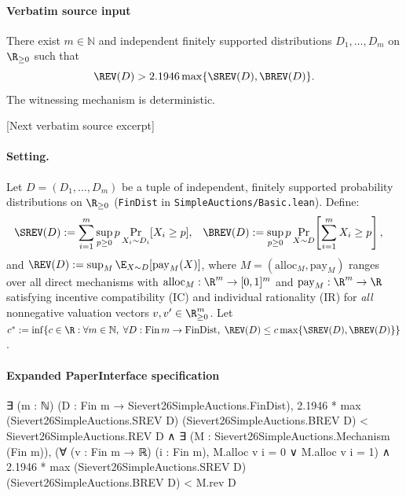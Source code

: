 \documentclass[10pt]{article}
\begin{document}
\paragraph{Verbatim source input}
\begin{ReviewVerbatim}
\begin{theorem}\label{thm:lb}
There exist $m \in \mathbb{N}$ and independent finitely supported distributions $D_1, \dots, D_m$ on $\R_{\ge 0}$ such that
\[
  \REV(D) > 2.1946 \max\{\SREV(D), \BREV(D)\}.
\]
The witnessing mechanism is deterministic.
\end{theorem}

[Next verbatim source excerpt]

\paragraph{Setting.}
Let $D = (D_1, \dots, D_m)$ be a tuple of independent, finitely supported probability distributions on $\R_{\ge 0}$ (\texttt{FinDist} in \texttt{SimpleAuctions/Basic.lean}). Define:
\begin{align*}
  \SREV(D) &:= \sum_{i=1}^m \sup_{p \ge 0} p \Pr_{X_i \sim D_i}[X_i \ge p], &
  \BREV(D) &:= \sup_{p \ge 0} p \Pr_{X \sim D}\!\left[\sum_{i=1}^m X_i \ge p\right],
\end{align*}
and $\REV(D) := \sup_{M} \E_{X \sim D}[\mathrm{pay}_M(X)]$, where $M = (\mathrm{alloc}_M, \mathrm{pay}_M)$ ranges over all direct mechanisms with $\mathrm{alloc}_M : \R^m \to [0,1]^m$ and $\mathrm{pay}_M : \R^m \to \R$ satisfying incentive compatibility (IC) and individual rationality (IR) for \emph{all} nonnegative valuation vectors $v, v' \in \R_{\ge 0}^m$. Let $c^* := \inf\{c \in \R : \forall m \in \mathbb{N},\; \forall D : \mathrm{Fin}\,m \to \mathrm{FinDist},\; \REV(D) \le c \max\{\SREV(D),\BREV(D)\}\}$.
\end{ReviewVerbatim}



\paragraph{Expanded PaperInterface specification}
\begin{ReviewVerbatim}
∃ (m : ℕ) (D : Fin m → Sievert26SimpleAuctions.FinDist),
  2.1946 * max (Sievert26SimpleAuctions.SREV D) (Sievert26SimpleAuctions.BREV D) < Sievert26SimpleAuctions.REV D ∧
    ∃ (M : Sievert26SimpleAuctions.Mechanism (Fin m)),
      (∀ (v : Fin m → ℝ) (i : Fin m), M.alloc v i = 0 ∨ M.alloc v i = 1) ∧
        2.1946 * max (Sievert26SimpleAuctions.SREV D) (Sievert26SimpleAuctions.BREV D) < M.rev D
\end{ReviewVerbatim}
\end{document}
